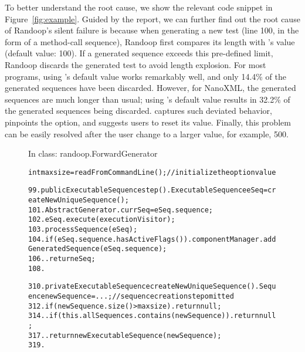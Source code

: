 To better understand the root cause, we show
the relevant code snippet in Figure~\ref{fig:example}.
Guided by the report, we can further find out
the root cause of Randoop's silent failure
is because when generating a new
test (line 100, in the form of a method-call sequence),
Randoop first compares its length with
's value (default value: 100). If a
generated sequence exceeds this pre-defined limit,
Randoop discards the generated test to avoid length explosion.
For most programs, using 's default value works remarkably
well, and only 14.4\% of the generated sequences have been discarded.
However, for NanoXML, the generated sequences are
much longer than usual; using 's default value
results in 32.2\% of the generated sequences being discarded.
\ourtool captures such deviated behavior, pinpoints the
 option, and suggests users to reset its value.
Finally, this problem can be easily resolved after
the user change  to a larger value, for example, 500.

\begin{figure}[t]
\vspace{-2mm}
{In class: randoop.ForwardGenerator}\\
\vspace{-4mm}
\begin{CodeOut}
\begin{alltt}
int maxsize = readFromCommandLine(); //{initialize the option value}

99.  public ExecutableSequence step() .   ExecutableSequence eSeq = createNewUniqueSequence();
101.   AbstractGenerator.currSeq = eSeq.sequence;
102.   eSeq.execute(executionVisitor);
103.   processSequence(eSeq);
104.   if (eSeq.sequence.hasActiveFlags()) .     componentManager.addGeneratedSequence(eSeq.sequence);
106.   .   return eSeq;
108. \ttrcb

310. private ExecutableSequence createNewUniqueSequence() .   Sequence newSequence = ...; //sequence creation step omitted
312.   if (newSequence.size() > maxsize) .     return null;
314.   .   if (this.allSequences.contains(newSequence)) .     return null;
317.   .   return new ExecutableSequence(newSequence);
319. \ttrcb
\end{alltt}
\end{CodeOut}
\tinystep
\vspace*{-3.0ex}  %
\end{figure}




